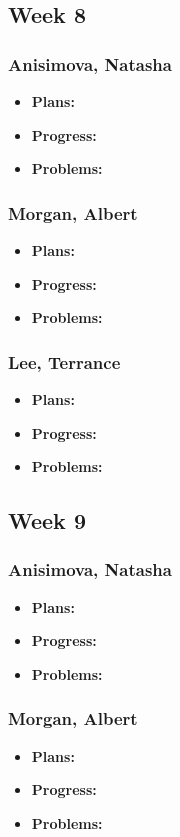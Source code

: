 \documentclass[10pt,draftclsnofoot,onecolumn]{IEEEtran}
\begin{document}
\subsection{Week 8}
\subsubsection{Anisimova, Natasha}
\begin{itemize}
	\item \textbf{Plans:}
	\item \textbf{Progress:}
	\item \textbf{Problems:}
\end{itemize}
\subsubsection{Morgan, Albert}
\begin{itemize}
	\item \textbf{Plans:}
	\item \textbf{Progress:}
	\item \textbf{Problems:}
\end{itemize}
\subsubsection{Lee, Terrance}
\begin{itemize}
	\item \textbf{Plans:}
	\item \textbf{Progress:}
	\item \textbf{Problems:}
\end{itemize}
\subsection{Week 9}
\subsubsection{Anisimova, Natasha}
\begin{itemize}
	\item \textbf{Plans:}
	\item \textbf{Progress:}
	\item \textbf{Problems:}
\end{itemize}
\subsubsection{Morgan, Albert}
\begin{itemize}
	\item \textbf{Plans:}
	\item \textbf{Progress:}
	\item \textbf{Problems:}
\end{itemize}
\end{document}
